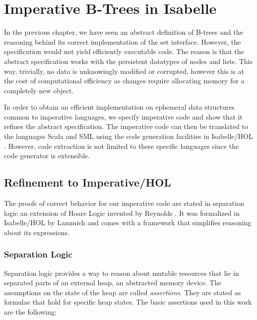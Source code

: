 
\chapter{Imperative B-Trees in Isabelle}\label{chapter:imp-set}

In the previous chapter, we have seen
an abstract definition of B-trees and the reasoning
behind its correct implementation of the set interface.
However, the specification would not yield 
efficiently executable code.
The reason is that the abstract specification works with
the persistent datatypes of nodes and lists.
This way, trivially, no data is unknowingly
modified or corrupted,
however this is at the cost of computational efficiency
as changes require allocating memory for a completely new object.

In order to obtain an efficient implementation
on ephemeral data structures common to imperative languages,
we specify imperative code and show that
it refines the abstract specification.
The imperative code can then be translated to
the languages Scala \parencite{OderskyScala} and SML \parencite{DBLP:books/daglib/0069232}
using the code generation
facilities in Isabelle/HOL \parencite{Haftmann20codegeneration}.
However, code extraction is not limited
to these specific languages
since the code generator is extensible.

\section{Refinement to Imperative/HOL}

The proofs of correct behavior for our imperative
code are stated in separation logic
an extension of Hoare Logic invented by Reynolds \parencite{DBLP:conf/lics/Reynolds02}.
It was formalized in Isabelle/HOL by Lammich \parencite{DBLP:journals/jar/Lammich19}
and comes with a framework that simplifies reasoning about
its expressions.

\subsection{Separation Logic}

Separation logic provides a way to reason about mutable resources
that lie in separated parts of an external heap,
an abstracted memory device.
The assumptions on the state of the heap are called \textit{assertions}.
They are stated as formulae that hold for specific heap states.
The basic assertions used in this work are the following:

